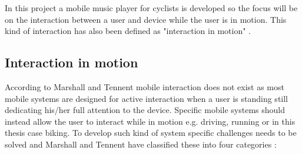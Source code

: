 In this project a mobile music player for cyclists is developed so the focus will be on the interaction between a user and device while the user is in motion. This kind of interaction has also been defined as "interaction in motion" \cite{marshall_mobile_2013}.

\subsection{Interaction in motion}
\label{sec:interactioninmotion}
According to Marshall and Tennent \cite{marshall_mobile_2013} mobile interaction does not exist as most mobile systems are designed for active interaction when a user is standing still dedicating his/her full attention to the device. Specific mobile systems should instead allow the user to interact while in motion e.g. driving, running or in this thesis case biking. To develop such kind of system specific challenges needs to be solved and Marshall and Tennent have classified these into four categories \cite{marshall_mobile_2013}:

